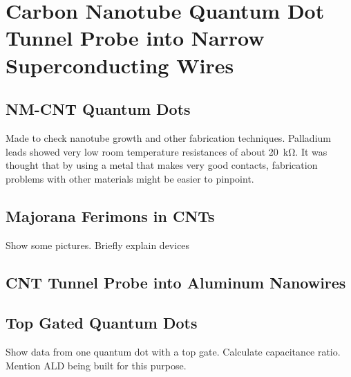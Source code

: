 \chapter{Carbon Nanotube Quantum Dot Tunnel Probe into Narrow Superconducting Wires}
\label{sec:CTNTAL}

\section{NM-CNT Quantum Dots}

Made to check nanotube growth and other fabrication techniques. Palladium leads showed very low room temperature resistances of about \SI{20}{\kilo\ohm}. It was thought that by using a metal that makes very good contacts, fabrication problems with other materials might be easier to pinpoint.

\section{Majorana Ferimons in CNTs}

Show some pictures. Briefly explain devices

\section{CNT Tunnel Probe into Aluminum Nanowires}

\section{Top Gated Quantum Dots}

Show data from one quantum dot with a top gate. Calculate capacitance ratio. Mention ALD being built for this purpose.